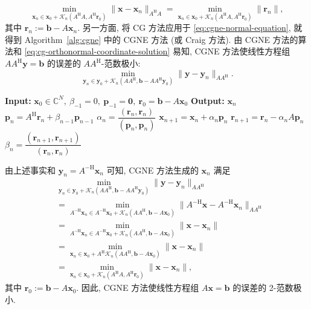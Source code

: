 \[\min_{\bm x_n\in\bm x_0+\mathcal K_n(A^{\mathrm H}A,A^{\mathrm H}\bm r_0)}\|\bm x-\bm x_n\|_{A^{\mathrm H}A}=\min_{\bm x_n\in\bm x_0+\mathcal K_n(A^{\mathrm H}A,A^{\mathrm H}\bm r_0)}\|\bm r_n\|,\]
{其中 $\bm r_n:=\bm b-A\bm x_n$.}
{另一方面, 将 CG 方法应用于 \eqref{eq:cgne-normal-equation}, 就得到 Algorithm\ \ref{alg:cgne} 中的 CGNE 方法  (或 Craig 方法). 由 CGNE 方法的算法和 \eqref{eq:cg-orthonormal-coordinate-solution} 易知, CGNE 方法使线性方程组 $AA^{\mathrm H}\bm y=\bm b$ 的误差的 $AA^{\mathrm H}$-范数极小:}
\[\min_{\bm y_n\in\bm y_0+\mathcal K_n(AA^{\mathrm H},\bm b-AA^{\mathrm H}\bm y_0)}\|\bm y-\bm y_n\|_{AA^{\mathrm H}}.\]
\begin{algorithm}[H]\caption{{CGNE 方法}}\label{alg:cgne}\begin{algorithmic}[1]
\Statex\textbf{Input:} $\bm x_0\in\mathbb C^N,\ \beta_{-1}=0,\ \bm p_{-1}=\bm0,\ \bm r_0=\bm b-A\bm x_0$
\Statex\textbf{Output:} $\bm x_n$
\State $\bm p_n=A^{\mathrm H}\bm r_n+\beta_{n-1}\bm p_{n-1}$
\State $\alpha_n=\dfrac{(\bm r_n,\bm r_n)}{(\bm p_n,\bm p_n)}$
\State $\bm x_{n+1}=\bm x_n+\alpha_n\bm p_n$
\State $\bm r_{n+1}=\bm r_n-\alpha_nA\bm p_n$
\State $\beta_n=\dfrac{(\bm r_{n+1},\bm r_{n+1})}{(\bm r_n,\bm r_n)}$
\EndFor\end{algorithmic}\end{algorithm}
{由上述事实和 $\bm y_n=A^{-\mathrm H}\bm x_n$ 可知, CGNE 方法生成的 $\bm x_n$ 满足}
\[\begin{aligned}
&\min_{\bm y_n\in\bm y_0+\mathcal K_n(AA^{\mathrm H},\bm b-AA^{\mathrm H}\bm y_0)}\|\bm y-\bm y_n\|_{AA^{\mathrm H}}\\
&=\min_{A^{-\mathrm H}\bm x_n\in A^{-\mathrm H}\bm x_0+\mathcal K_n(AA^{\mathrm H},\bm b-A\bm x_0)}\|A^{-\mathrm H}\bm x-A^{-\mathrm H}\bm x_n\|_{AA^{\mathrm H}}\\
&=\min_{A^{-\mathrm H}\bm x_n\in A^{-\mathrm H}\bm x_0+\mathcal K_n(AA^{\mathrm H},\bm b-A\bm x_0)}\|\bm x-\bm x_n\|\\
&=\min_{\bm x_n\in\bm x_0+A^{\mathrm H}\mathcal K_n(AA^{\mathrm H},\bm b-A\bm x_0)}\|\bm x-\bm x_n\|\\
&=\min_{\bm x_n\in\bm x_0+\mathcal K_n(A^{\mathrm H}A,A^{\mathrm H}\bm r_0)}\|\bm x-\bm x_n\|,
\end{aligned}\]
{其中 $\bm r_0:=\bm b-A\bm x_0$. 因此, CGNE 方法使线性方程组 $A\bm x=\bm b$ 的误差的 2-范数极小.}
